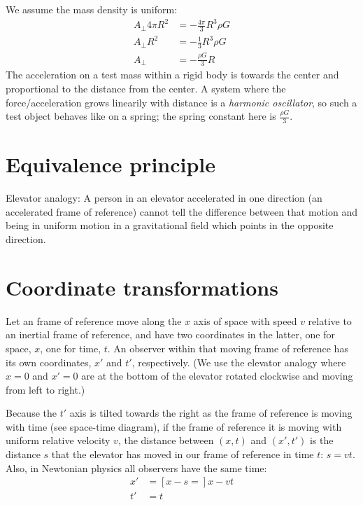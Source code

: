 \documentclass[pagesize,headsepline,10pt,parskip=half,BCOR=12mm]{scrreprt}
\begin{document}
        We assume the mass density is uniform:
        \begin{align}
          A_\perp 4 \pi R^2 &= -\frac{4\pi}{3} R^3 \rho G \\
          A_\perp R^2 &= -\frac{1}{3} R^3 \rho G \\
          A_\perp &= -\frac{\rho G}{3} R
        \end{align}
        The acceleration on a test mass within a rigid body is
        towards the center and proportional to the distance
        from the center. A system where the force/acceleration
        grows linearily with distance is a \emph{harmonic
        oscillator}, so such a test object behaves like on a
        spring; the spring constant here is $\frac{\rho G}{3}$.

    \section{Equivalence principle}
      Elevator analogy: A person in an elevator accelerated in one
      direction (an accelerated frame of reference) cannot tell the
      difference between that motion and being in uniform motion in
      a gravitational field which points in the opposite direction.

    \section{Coordinate transformations}
      Let an frame of reference move along the $x$ axis of space
      with speed $v$ relative to an inertial frame of reference,
      and have two coordinates in the latter, one for space, $x$,
      one for time, $t$. An observer within that moving frame of
      reference has its own coordinates, $x'$ and $t'$,
      respectively. (We use the elevator analogy where $x=0$ and
      $x'=0$ are at the bottom of the elevator rotated clockwise
      and moving from left to right.)

      Because the $t'$ axis is tilted towards the right as the
      frame of reference is moving with time (see space-time
      diagram), if the frame of reference it is moving with
      uniform relative velocity $v$, the distance between $(x, t)$
      and $(x', t')$ is the distance $s$ that the elevator has
      moved in our frame of reference in time $t$: $s = vt$.
      Also, in Newtonian physics all observers have the same time:
      \begin{align}
        x' &= \left[x - s =\right] x - vt\\
        t' &= t
      \end{align}
\end{document}

